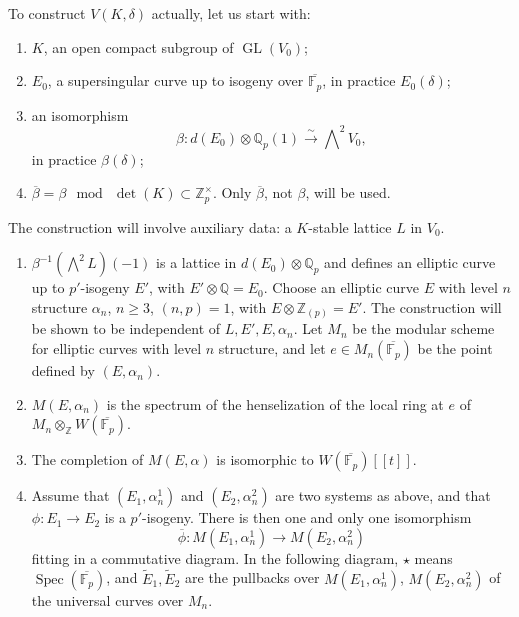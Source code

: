 \documentclass[11pt]{article}
\newcommand{\Q}{\mathbb{Q}}
\newcommand{\Z}{\mathbb{Z}}
\newcommand{\Fp}{\mathbb{F}_{p}}
\newcommand{\Qp}{\mathbb{Q}_{p}}
\newcommand{\Zp}{\mathbb{Z}_{p}}
\newcommand{\Spec}{\operatorname{Spec}}
\newcommand{\GL}{\operatorname{GL}}
\newcommand{\wt}{\widetilde}
\begin{document}
To construct \(V(K,\delta)\) actually, let us start with:
\begin{enumerate}[label=(\alph*)]
\item \(K\), an open compact subgroup of \(\GL(V_0)\);
\item \(E_0\), a supersingular curve up to isogeny over \(\overline{\Fp}\), in practice \(E_0(\delta)\);
\item an isomorphism
\[
\beta:d(E_0)\otimes\Qp(1)\xrightarrow{\sim}\bigwedge\nolimits^2V_0,
\]
in practice \(\beta(\delta)\);
\item \(\overline{\beta}=\beta\ \bmod\ \det(K)\subset\Zp^\times\). Only \(\overline{\beta}\), not \(\beta\), will be used.
\end{enumerate}
The construction will involve auxiliary data: a \(K\)-stable lattice \(L\) in \(V_0\).
\begin{enumerate}[label=(\alph*)]
\item \(\beta^{-1}(\bigwedge^2L)(-1)\) is a lattice in \(d(E_0)\otimes\Qp\) and defines an elliptic curve up to \(p'\)-isogeny \(E'\), with \(E'\otimes\Q=E_0\). Choose an elliptic curve \(E\) with level \(n\) structure \(\alpha_n\), \(n\geq3\), \((n,p)=1\), with \(E\otimes\Z_{(p)}=E'\). The construction will be shown to be independent of \(L,E',E,\alpha_n\). Let \(M_n\) be the modular scheme for elliptic curves with level \(n\) structure, and let \(e\in M_n(\overline{\Fp})\) be the point defined by \((E,\alpha_n)\).
\item \(M(E,\alpha_n)\) is the spectrum of the henselization of the local ring at \(e\) of \(M_n\otimes_{\Z}W(\overline{\Fp})\).
\item The completion of \(M(E,\alpha)\) is isomorphic to \(W(\overline{\Fp})[[t]]\).
\item Assume that \((E_1,\alpha_n^1)\) and \((E_2,\alpha_n^2)\) are two systems as above, and that \(\phi:E_1\to E_2\) is a \(p'\)-isogeny. There is then one and only one isomorphism
\[
\overline{\phi}:M(E_1,\alpha_n^1)\longrightarrow M(E_2,\alpha_n^2)
\]
fitting in a commutative diagram. In the following diagram, \(\star\) means \(\Spec(\overline{\Fp})\), and \(\wt E_1,\wt E_2\) are the pullbacks over \(M(E_1,\alpha_n^1)\), \(M(E_2,\alpha_n^2)\) of the universal curves over \(M_n\).


\end{enumerate}
\end{document}
